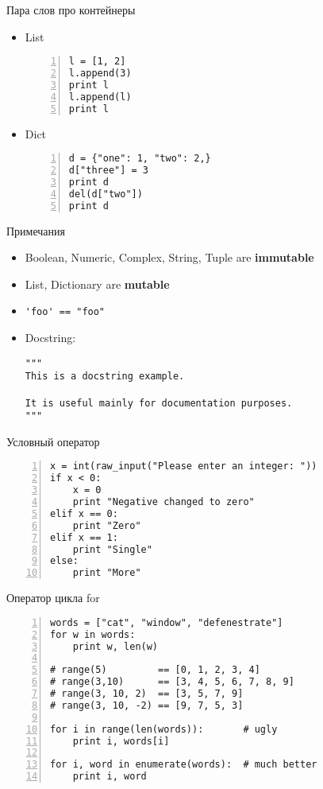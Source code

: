 \documentclass[hyperref={pdftex,unicode}]{beamer}
\begin{document}
\begin{frame}[fragile]{Пара слов про контейнеры}
  \begin{itemize}
  \item List
    \begin{lstlisting}[numbers=left]
l = [1, 2]
l.append(3)
print l
l.append(l)
print l
    \end{lstlisting}
  \item Dict
    \begin{lstlisting}[numbers=left]
d = {"one": 1, "two": 2,}
d["three"] = 3
print d
del(d["two"])
print d
    \end{lstlisting}
  \end{itemize}
\end{frame}

\begin{frame}[fragile]{Примечания}
  \begin{itemize}
    \item Boolean, Numeric, Complex, String, Tuple are \textbf{immutable}
    \item List, Dictionary are \textbf{mutable}
    \item \lstinline$'foo' == "foo"$
    \item Docstring:
      \begin{lstlisting}
"""
This is a docstring example.

It is useful mainly for documentation purposes.
"""
      \end{lstlisting}
  \end{itemize}
\end{frame}

\begin{frame}[fragile]{Условный оператор}
  \begin{lstlisting}[numbers=left]
x = int(raw_input("Please enter an integer: "))
if x < 0:
    x = 0
    print "Negative changed to zero"
elif x == 0:
    print "Zero"
elif x == 1:
    print "Single"
else:
    print "More"
  \end{lstlisting}
\end{frame}

\begin{frame}[fragile]{Оператор цикла for}
  \begin{lstlisting}[numbers=left]
words = ["cat", "window", "defenestrate"]
for w in words:
    print w, len(w)

# range(5)         == [0, 1, 2, 3, 4]
# range(3,10)      == [3, 4, 5, 6, 7, 8, 9]
# range(3, 10, 2)  == [3, 5, 7, 9]
# range(3, 10, -2) == [9, 7, 5, 3]

for i in range(len(words)):       # ugly
    print i, words[i]

for i, word in enumerate(words):  # much better
    print i, word

\end{lstlisting}
\end{frame}
\end{document}
